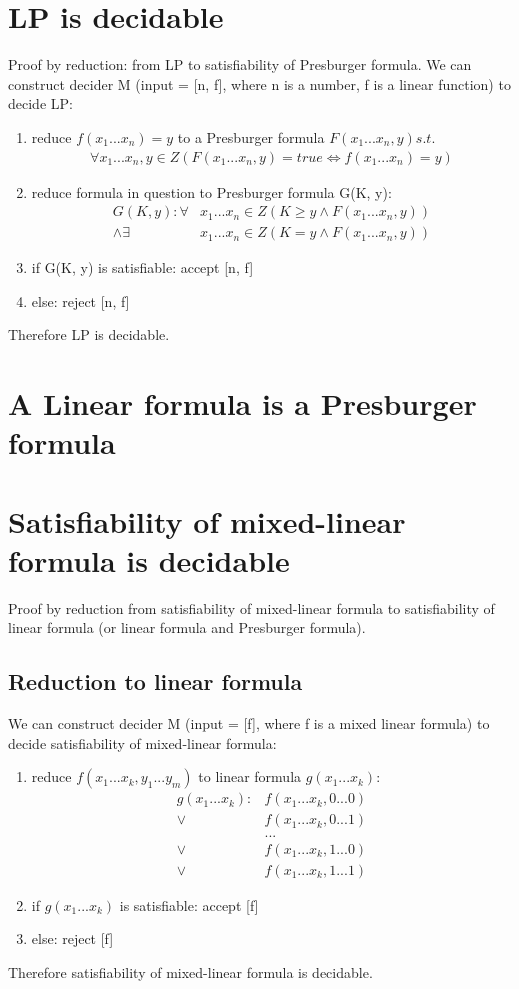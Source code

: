 \documentclass{article}
\begin{document}
\section{LP is decidable}
Proof by reduction: from LP to satisfiability of Presburger formula.
We can construct decider M (input = [n, f], where n is a number, 
f is a linear function) to decide LP:
\begin{enumerate}
	\item reduce $ f(x_1...x_n) = y $ to a Presburger formula $ F(x_1...x_n, y) 
	s.t. $
	\begin{align*}
		\forall x_1...x_n, y \in Z (F(x_1...x_n,y) = true \iff f(x_1...x_n) =y)
	\end{align*}
	\item reduce formula in question to Presburger formula G(K, y):
	\begin{align*}
		G(K, y): \forall& x_1 ... x_n \in Z(K \ge y \land F(x_1 ... x_n, y)) \\
		\land \exists& x_1 ... x_n \in Z (K = y \land F(x_1 ... x_n, y))
	\end{align*}
	\item if G(K, y) is satisfiable: accept [n, f]
	\item else: reject [n, f]
\end{enumerate}
Therefore LP is decidable.

\section{A Linear formula is a Presburger formula}

\section{Satisfiability of mixed-linear formula is decidable}

Proof by reduction from satisfiability of mixed-linear formula to 
satisfiability of linear formula (or linear formula and Presburger formula).

\subsection{Reduction to linear formula}
We can construct decider M (input = [f], where f is a mixed linear formula) to 
decide satisfiability of mixed-linear formula:
\begin{enumerate}
	\item reduce $ f(x_1 ... x_k, y_1 ... y_m) $ to linear formula $ g(x_1 ... 
	x_k) $:
	\begin{align*}
		g(x_1 ... x_k):& f(x_1 ... x_k, 0 ... 0) \\
		 \lor& f(x_1 ... x_k, 0 ... 1) \\
		& ... \\
		\lor& f(x_1 ... x_k, 1 ... 0) \\
		\lor& f(x_1 ... x_k, 1 ... 1)
	\end{align*}
	\item if $ g(x_1 ... x_k) $ is satisfiable: accept [f]
	\item else: reject [f]
\end{enumerate}
Therefore satisfiability of mixed-linear formula is decidable.
\end{document}
